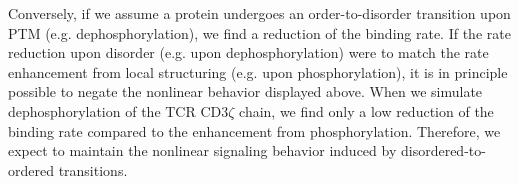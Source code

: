 \documentclass[../../AdvancementSummary.tex]{subfiles}
\begin{document}
%




Conversely, if we assume a protein undergoes an order-to-disorder transition upon PTM (e.g. dephosphorylation), we find a reduction of the binding rate.
	If the rate reduction upon disorder (e.g. upon dephosphorylation) were to match the rate enhancement from local structuring (e.g. upon phosphorylation), it is in principle possible to negate the nonlinear behavior displayed above.
	When we simulate dephosphorylation of the TCR CD3$\zeta$ chain, we find only a low reduction of the binding rate compared to the enhancement from phosphorylation.
	Therefore, we expect to maintain the nonlinear signaling behavior induced by disordered-to-ordered transitions.
	

%

%
\end{document}
